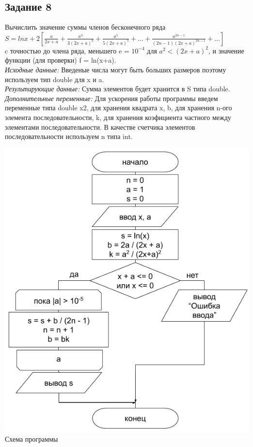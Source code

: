\documentclass[a4paper,14pt]{extarticle}
\begin{document}
\subsection{Задание 8}
Вычислить значение суммы членов бесконечного ряда\\
$S = ln x + \displaystyle2[\frac {a} {2x+a} + \frac {a^3} {3(2x+a)^3} + \frac {a^5} {5(2x+a)^5}
+ ... + \frac {a^{2n-1}} {(2n-1)(2x+a)^{2n-1}} + ...]$\\
c точностью до члена ряда, меньшего  e = $10^{-4}$ для $a^2<(2x+a)^2$, и значение функции (для проверки) f = ln(x+a).\\
\textit{Исходные данные:} Введеные числа могут быть больших размеров поэтому используем тип double для x и a.\\
\textit{Результирующие данные:} Сумма элементов будет хранится в S типа double.\\
\textit{Дополнительные переменные:} Для ускорения работы программы введем переменные типа double x2, для хранения квадрата x, b, для хранения n-ого элемента последовательности, k, для хранения коэфициента частного между элементами последовательности. В качестве счетчика элементов последовательности используем n типа int.\\
\begin{center}
\includegraphics[scale=0.6]{lab2-8.png}\\
Схема программы
\end{center}
\end{document}
